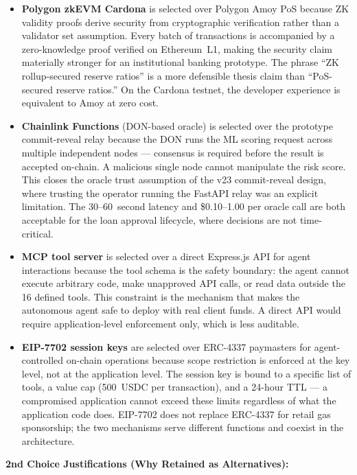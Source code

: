 \documentclass[12pt,a4paper]{report}
\begin{document}
\begin{itemize}[noitemsep]
\item \textbf{Polygon zkEVM Cardona} is selected over Polygon Amoy PoS because ZK validity proofs derive security from cryptographic verification rather than a validator set assumption. Every batch of transactions is accompanied by a zero-knowledge proof verified on Ethereum~L1, making the security claim materially stronger for an institutional banking prototype. The phrase ``ZK rollup-secured reserve ratios'' is a more defensible thesis claim than ``PoS-secured reserve ratios.'' On the Cardona testnet, the developer experience is equivalent to Amoy at zero cost.

\item \textbf{Chainlink Functions} (DON-based oracle) is selected over the prototype commit-reveal relay because the DON runs the ML scoring request across multiple independent nodes --- consensus is required before the result is accepted on-chain. A malicious single node cannot manipulate the risk score. This closes the oracle trust assumption of the v23 commit-reveal design, where trusting the operator running the FastAPI relay was an explicit limitation. The 30--60~second latency and \$0.10--1.00 per oracle call are both acceptable for the loan approval lifecycle, where decisions are not time-critical.

\item \textbf{MCP tool server} is selected over a direct Express.js API for agent interactions because the tool schema is the safety boundary: the agent cannot execute arbitrary code, make unapproved API calls, or read data outside the 16 defined tools. This constraint is the mechanism that makes the autonomous agent safe to deploy with real client funds. A direct API would require application-level enforcement only, which is less auditable.

\item \textbf{EIP-7702 session keys} are selected over ERC-4337 paymasters for agent-controlled on-chain operations because scope restriction is enforced at the key level, not at the application level. The session key is bound to a specific list of tools, a value cap (500~USDC per transaction), and a 24-hour TTL --- a compromised application cannot exceed these limits regardless of what the application code does. EIP-7702 does not replace ERC-4337 for retail gas sponsorship; the two mechanisms serve different functions and coexist in the architecture.
\end{itemize}

\textbf{2nd Choice Justifications (Why Retained as Alternatives):}
\end{document}
